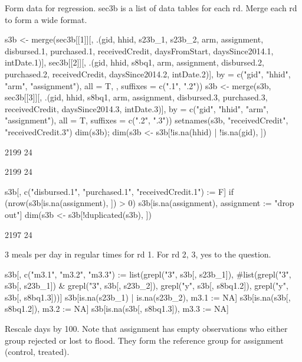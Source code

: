 Form data for regression. \textsf{sec3b} is a list of data tables for each rd. Merge each rd to form a wide format.
\begin{Schunk}
\begin{Sinput}
s3b <- merge(sec3b[[1]][, .(gid, hhid, s23b_1, s23b_2, arm, assignment, 
	disbursed.1, purchased.1, receivedCredit, 
	daysFromStart, daysSince2014.1, intDate.1)],
	sec3b[[2]][, .(gid, hhid, s8bq1, arm, assignment, 
	disbursed.2, purchased.2, receivedCredit, daysSince2014.2, intDate.2)], 
	by = c("gid", "hhid", "arm", "assignment"), all = T, , suffixes = c(".1", ".2"))
s3b <- merge(s3b, sec3b[[3]][, .(gid, hhid, s8bq1, arm, assignment, 
	disbursed.3, purchased.3, receivedCredit, daysSince2014.3, intDate.3)], 
	by = c("gid", "hhid", "arm", "assignment"), all = T, suffixes = c(".2", ".3"))
setnames(s3b, "receivedCredit", "receivedCredit.3")
dim(s3b); dim(s3b <- s3b[!is.na(hhid) | !is.na(gid), ])
\end{Sinput}
\begin{Soutput}
[1] 2199   24
\end{Soutput}
\begin{Soutput}
[1] 2199   24
\end{Soutput}
\begin{Sinput}
s3b[, c("disbursed.1", "purchased.1", "receivedCredit.1") := F]
if (nrow(s3b[is.na(assignment), ]) > 0) 
	s3b[is.na(assignment), assignment := "drop out"]
dim(s3b <- s3b[!duplicated(s3b), ])
\end{Sinput}
\begin{Soutput}
[1] 2197   24
\end{Soutput}
\end{Schunk}
3 meals per day in regular times for rd 1. For rd 2, 3, yes to the question.
\begin{Schunk}
\begin{Sinput}
s3b[, c("m3.1", "m3.2", "m3.3") := 
	list(grepl("3", s3b[, s23b_1]),
	#list(grepl("3", s3b[, s23b_1]) & grepl("3", s3b[, s23b_2]),
	grepl("y", s3b[, s8bq1.2]),
	grepl("y", s3b[, s8bq1.3]))]
s3b[is.na(s23b_1) | is.na(s23b_2), m3.1 := NA]
s3b[is.na(s3b[, s8bq1.2]), m3.2 := NA]
s3b[is.na(s3b[, s8bq1.3]), m3.3 := NA]
\end{Sinput}
\end{Schunk}
Rescale days by 100. Note that \textsf{assignment} has empty observations who either group rejected or lost to flood. They form the reference group for \textsf{assignment (control, treated)}. 

